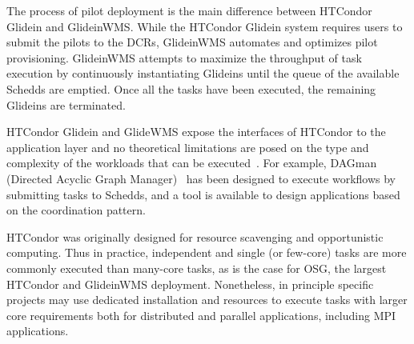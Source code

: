 \documentclass{sig-alternate}
\begin{document}
The process of pilot deployment is the main difference between HTCondor Glidein
and GlideinWMS. While the HTCondor Glidein system requires users to submit the
pilots to the DCRs, GlideinWMS automates and optimizes pilot provisioning.
GlideinWMS attempts to maximize the throughput of task execution by continuously
instantiating Glideins until the queue of the available Schedds are emptied.
Once all the tasks have been executed, the remaining Glideins are terminated.


HTCondor Glidein and GlideWMS expose the interfaces of HTCondor to the
application layer and no theoretical limitations are posed on the type and
complexity of the workloads that can be executed~\cite{couvares2007workflow}.
For example, DAGman (Directed Acyclic Graph Manager)~\cite{frey2002condor} has
been designed to execute workflows by submitting tasks to Schedds, and a tool is
available to design applications based on the \MW coordination pattern.



HTCondor was originally designed for resource scavenging and opportunistic
computing.  Thus in practice, independent and single (or few-core) tasks are
more commonly executed than many-core tasks, as is the case for OSG, the largest
HTCondor and GlideinWMS deployment. Nonetheless, in principle specific projects
may use dedicated installation and resources to execute tasks with larger core
requirements both for distributed and parallel applications, including MPI
applications.

\end{document}
